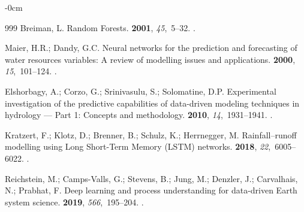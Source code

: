 \documentclass[land,review,accept,pdftex,oneauthor]{Definitions/mdpi}
\begin{document}
\begin{adjustwidth}{-\extralength}{0cm}
\begin{thebibliography}{999}
Breiman, L.
\newblock Random Forests. %
 {\bf 2001}, {\em 45},~5--32.
.

Maier, H.R.; Dandy, G.C.
\newblock Neural networks for the prediction and forecasting of water resources
  variables: A review of modelling issues and applications.
 {\bf 2000}, {\em
  15},~101--124.
.

Elshorbagy, A.; Corzo, G.; Srinivasulu, S.; Solomatine, D.P.
\newblock Experimental investigation of the predictive capabilities of
  data-driven modeling techniques in hydrology --- Part 1: Concepts and
  methodology.
 {\bf 2010}, {\em
  14},~1931--1941.
.

Kratzert, F.; Klotz, D.; Brenner, B.; Schulz, K.; Herrnegger, M.
\newblock Rainfall--runoff modelling using Long Short-Term Memory (LSTM)
  networks. %
 {\bf 2018}, {\em
  22},~6005--6022.
.

Reichstein, M.; Camps-Valls, G.; Stevens, B.; Jung, M.; Denzler, J.;
  Carvalhais, N.; Prabhat, F.
\newblock Deep learning and process understanding for data-driven Earth system
  science. %
 {\bf 2019}, {\em 566},~195--204.
.


\end{thebibliography}
\end{adjustwidth}
\end{document}
